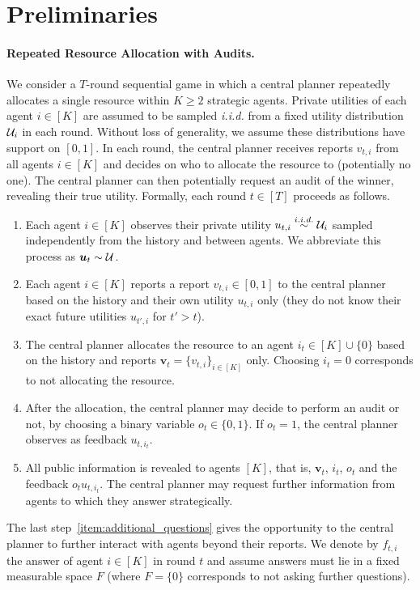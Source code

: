 
\section{Preliminaries}\label{sec:setup}

\paragraph{Repeated Resource Allocation with Audits.} We consider a $T$-round sequential game in which a central planner repeatedly allocates a single resource within $K\geq 2$ strategic agents. Private utilities of each agent $i\in[K]$ are assumed to be sampled \textit{i.i.d.} from a fixed utility distribution $\mathcal{U}_i$ in each round. Without loss of generality, we assume these distributions have support on $[0,1]$. In each round, the central planner receives reports $v_{t,i}$ from all agents $i\in[K]$ and decides on who to allocate the resource to (potentially no one). The central planner can then potentially request an {audit} of the winner, revealing their true utility. Formally, each round $t\in[T]$ proceeds as follows.
\begin{enumerate}
    \item Each agent $i\in[K]$ observes their private utility $u_{t,i}\overset{i.i.d.}{\sim} \mathcal{U}_i$ sampled independently from the history and between agents. We abbreviate this process as $\bm u_t\sim \mathcal{U}$.
    \item Each agent $i\in[K]$ reports a report $v_{t,i}\in [0,1]$ to the central planner based on the history and their own utility $u_{t,i}$ only (they do not know their exact future utilities $u_{t',i}$ for $t'>t$).
    \item The central planner allocates the resource to an agent $i_t\in[K]\cup\{0\}$ based on the history and reports $\bm v_t=\{v_{t,i}\}_{i\in[K]}$ only. Choosing $i_t=0$ corresponds to not allocating the resource.
    \item After the allocation, the central planner may decide to perform an {audit} or not, by choosing a binary variable $o_t\in\{0,1\}$. If $o_t=1$, the central planner observes as feedback $u_{t,i_t}$. \label{item:possible_audit}
    \item All public information is revealed to agents $[K]$, that is, $\bm v_t$, $i_t$, $o_t$ and the feedback $o_t u_{t,i_t}$. The central planner may request further information from agents to which they answer strategically.
    \label{item:additional_questions}
\end{enumerate}
The last step~\ref{item:additional_questions} gives the opportunity to the central planner to further interact with agents beyond their reports. We denote by $f_{t,i}$ the answer of agent $i\in[K]$ in round $t$ and assume answers must lie in a fixed measurable space $F$ (where $F=\{0\}$ corresponds to not asking further questions).

